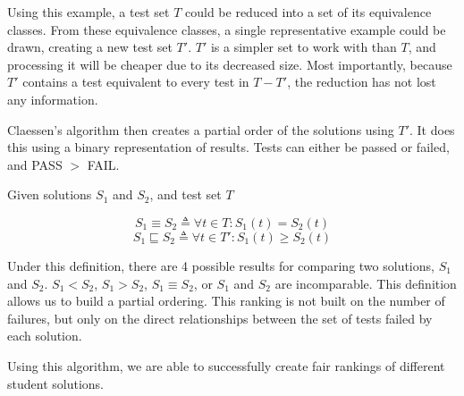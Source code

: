 \documentclass[11pt,twoside]{article}
\newcommand\defined{\triangleq}
\begin{document}
Using this example, a test set $T$ could be reduced into a set of its equivalence classes. From these equivalence classes, a single representative example could be drawn, creating a new test set $T'$. $T'$ is a simpler set to work with than $T$, and processing it will be cheaper due to its decreased size. Most importantly, because $T'$ contains a test equivalent to every test in $T - T'$, the reduction has not lost any information.


Claessen's algorithm then creates a partial order of the solutions using $T'$. It does this using a binary representation of results. Tests can either be passed or failed, and PASS $>$ FAIL.

\centerline{Given solutions $S_1$ and $S_2$, and test set $T$}
$$S_1 \equiv S_2 \defined \forall t \in T : S_1(t) = S_2(t)$$
$$S_1 \sqsubseteq S_2 \defined \forall t \in T' : S_1(t) \geq S_2(t)$$


Under this definition, there are 4 possible results for comparing two solutions, $S_1$ and $S_2$. $S_1 < S_2$, $S_1 > S_2$, $S_1 \equiv S_2$, or $S_1$ and $S_2$  are incomparable. This definition allows us to build a partial ordering. This ranking is not built on the number of failures, but only on the direct relationships between the set of tests failed by each solution.

Using this algorithm, we are able to successfully create fair rankings of different student solutions.
\end{document}
